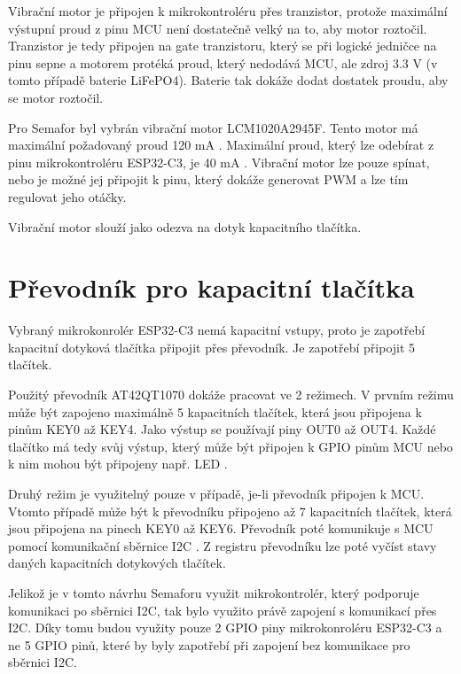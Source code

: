 Vibrační motor je připojen k mikrokontroléru přes tranzistor, protože maximální výstupní proud z pinu MCU není dostatečně velký na to, aby 
motor roztočil. Tranzistor je tedy připojen na gate tranzistoru, který se při logické jedničce na pinu sepne a motorem protéká proud, který 
nedodává MCU, ale zdroj 3.3 V (v tomto případě baterie LiFePO4). Baterie tak dokáže dodat dostatek proudu, aby se motor roztočil. 

Pro Semafor byl vybrán vibrační motor LCM1020A2945F. Tento motor má maximální požadovaný proud 120 mA \cite{vib_motor_dtsh}. Maximální proud, 
který lze odebírat z pinu mikrokontroléru ESP32-C3, je 40 mA \cite{ESP_C3_dtsh}. Vibrační motor lze pouze spínat, nebo je možné jej připojit 
k pinu, který dokáže generovat PWM a lze tím regulovat jeho otáčky. 

Vibrační motor slouží jako odezva na dotyk kapacitního tlačítka. 


\section{Převodník pro kapacitní tlačítka}
Vybraný mikrokonrolér ESP32-C3 nemá kapacitní vstupy, proto je zapotřebí kapacitní dotyková tlačítka připojit přes převodník. Je zapotřebí připojit 
5 tlačítek. 

Použitý převodník AT42QT1070 dokáže pracovat ve 2 režimech. V prvním režimu může být zapojeno maximálně 5 kapacitních tlačítek, která jsou připojena
k pinům KEY0 až KEY4. Jako výstup se používají piny OUT0 až OUT4. Každé tlačítko má tedy svůj výstup, který může být připojen k GPIO pinům MCU 
nebo k nim mohou být připojeny např. LED \cite{conv_cap_but_AT42QT1070_dtsh}. 

Druhý režim je využitelný pouze v případě, je-li převodník připojen k MCU. Vtomto případě může být k převodníku připojeno až 7 kapacitních tlačítek, 
která jsou připojena na pinech KEY0 až KEY6. Převodník poté komunikuje s MCU pomocí komunikační sběrnice I2C \cite{conv_cap_but_AT42QT1070_dtsh}. 
Z registru převodníku lze poté vyčíst stavy daných kapacitních dotykových tlačítek. 

Jelikož je v tomto návrhu Semaforu využit mikrokontrolér, který podporuje komunikaci po sběrnici I2C, tak bylo využito právě zapojení s komunikací 
přes I2C. Díky tomu budou využity pouze 2 GPIO piny mikrokonroléru ESP32-C3 a ne 5 GPIO pinů, které by byly zapotřebí při zapojení bez komunikace pro
sběrnici I2C.

